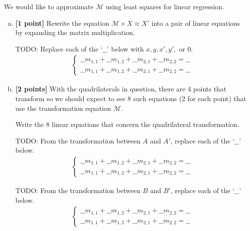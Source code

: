 We would like to approximate $\mathcal{M}$ using least squares for linear regression.

\begin{enumerate}[(a)]
\item \textbf{[1 point]} Rewrite the equation $\mathcal{M} \times X \approx X'$ into a pair of linear equations by expanding the matrix multiplication.

\begin{mdframed}
TODO: Replace each of the `$\_\_$' below with $x, y, x', y',$ or $0$.
\begin{align*}
\begin{cases}
    \_\_m_{1,1} + \_\_m_{1,2} + \_\_m_{2,1} + \_\_m_{2,2} = \_\_
    \\\_\_m_{1,1} + \_\_m_{1,2} + \_\_m_{2,1} + \_\_m_{2,2} = \_\_
\end{cases}
\end{align*}
\end{mdframed}

\item \textbf{[2 points]} With the quadrilaterals in question, there are 4 points that transform so we should expect to see 8 such equations (2 for each point) that use the transformation equation $\mathcal{M}$.

Write the 8 linear equations that concern the quadrilateral transformation.

\begin{mdframed}
TODO: From the transformation between $A$ and $A'$, replace each of the `$\_\_$' below.
\begin{align*}
\begin{cases}
    \_\_m_{1,1} + \_\_m_{1,2} + \_\_m_{2,1} + \_\_m_{2,2} = \_\_
    \\\_\_m_{1,1} + \_\_m_{1,2} + \_\_m_{2,1} + \_\_m_{2,2} = \_\_
\end{cases}
\end{align*}
\end{mdframed}

\begin{mdframed}
TODO: From the transformation between $B$ and $B'$, replace each of the `$\_\_$' below.
\begin{align*}
\begin{cases}
    \_\_m_{1,1} + \_\_m_{1,2} + \_\_m_{2,1} + \_\_m_{2,2} = \_\_
    \\\_\_m_{1,1} + \_\_m_{1,2} + \_\_m_{2,1} + \_\_m_{2,2} = \_\_
\end{cases}
\end{align*}
\end{mdframed}


\end{enumerate}
